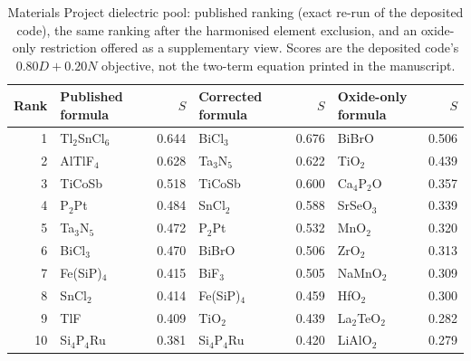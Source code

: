 \begin{table}[htbp]
\centering
\footnotesize
\setlength{\tabcolsep}{4pt}
\caption{Materials Project dielectric pool: published ranking (exact re-run of the deposited code), the same ranking after the harmonised element exclusion, and an oxide-only restriction offered as a supplementary view. Scores are the deposited code's $0.80D+0.20N$ objective, not the two-term equation printed in the manuscript.}
\label{tab:a1_dielectric}
\begin{tabular}{rlrlrlr}
\toprule
Rank & Published formula & $S$ & Corrected formula & $S$  & Oxide-only formula & $S$   \\
\midrule
1 & Tl$_{2}$SnCl$_{6}$ & 0.644 & BiCl$_{3}$ & 0.676 & BiBrO & 0.506 \\
2 & AlTlF$_{4}$ & 0.628 & Ta$_{3}$N$_{5}$ & 0.622 & TiO$_{2}$ & 0.439 \\
3 & TiCoSb & 0.518 & TiCoSb & 0.600 & Ca$_{4}$P$_{2}$O & 0.357 \\
4 & P$_{2}$Pt & 0.484 & SnCl$_{2}$ & 0.588 & SrSeO$_{3}$ & 0.339 \\
5 & Ta$_{3}$N$_{5}$ & 0.472 & P$_{2}$Pt & 0.532 & MnO$_{2}$ & 0.320 \\
6 & BiCl$_{3}$ & 0.470 & BiBrO & 0.506 & ZrO$_{2}$ & 0.313 \\
7 & Fe(SiP)$_{4}$ & 0.415 & BiF$_{3}$ & 0.505 & NaMnO$_{2}$ & 0.309 \\
8 & SnCl$_{2}$ & 0.414 & Fe(SiP)$_{4}$ & 0.459 & HfO$_{2}$ & 0.300 \\
9 & TlF & 0.409 & TiO$_{2}$ & 0.439 & La$_{2}$TeO$_{2}$ & 0.282 \\
10 & Si$_{4}$P$_{4}$Ru & 0.381 & Si$_{4}$P$_{4}$Ru & 0.420 & LiAlO$_{2}$ & 0.279 \\
\bottomrule
\end{tabular}
\end{table}

